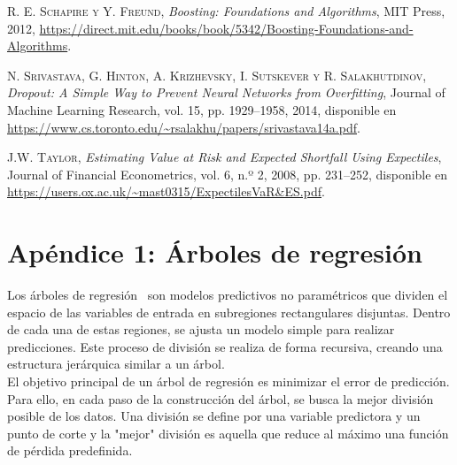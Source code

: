 \documentclass[11pt]{book}
\newcommand{\clearemptydoublepage}{\newpage{\pagestyle{empty}\cleardoublepage}}
\theoremstyle{plain} %
\theoremstyle{definition} %
\begin{document}
\begin{thebibliography}{99}
\textsc{R. E. Schapire y Y. Freund},
\textit{Boosting: Foundations and Algorithms}, 
MIT Press, 2012,
\url{https://direct.mit.edu/books/book/5342/Boosting-Foundations-and-Algorithms}.

\textsc{N. Srivastava, G. Hinton, A. Krizhevsky, I. Sutskever y R. Salakhutdinov},  
\textit{Dropout: A Simple Way to Prevent Neural Networks from Overfitting},  
Journal of Machine Learning Research, vol. 15, pp. 1929–1958, 2014,  
disponible en \url{https://www.cs.toronto.edu/~rsalakhu/papers/srivastava14a.pdf}.



\textsc{J.W. Taylor},  
\textit{Estimating Value at Risk and Expected Shortfall Using Expectiles},  
Journal of Financial Econometrics, vol. 6, n.º 2, 2008, pp. 231–252,  
disponible en  
\url{https://users.ox.ac.uk/~mast0315/ExpectilesVaR&ES.pdf}.










\end{thebibliography}

\clearemptydoublepage

\appendix
\renewcommand{\thechapter}{A\arabic{chapter}} %
\renewcommand{\thesection}{\thechapter.\arabic{section}} %
\renewcommand{\thesubsection}{\thesection.\arabic{subsection}} %

\setcounter{chapter}{1}

\chapter{Apéndice 1: Árboles de regresión }
\label{ap:arboles}
Los árboles de regresión~\cite{BFOS84} son modelos predictivos no paramétricos 
que dividen el espacio de las variables de entrada en subregiones rectangulares disjuntas. 
Dentro de cada una de estas regiones, se ajusta un modelo simple para realizar 
predicciones. Este proceso de división se realiza de forma recursiva, creando 
una estructura jerárquica similar a un árbol.\\

El objetivo principal de un árbol de regresión es minimizar el error de 
predicción. Para ello, en cada paso de la construcción del árbol, se busca la 
mejor división posible de los datos. Una división se define por una variable 
predictora y un punto de corte y la "mejor" división es aquella que reduce al 
máximo una función de pérdida predefinida.\\ 
\end{document}
